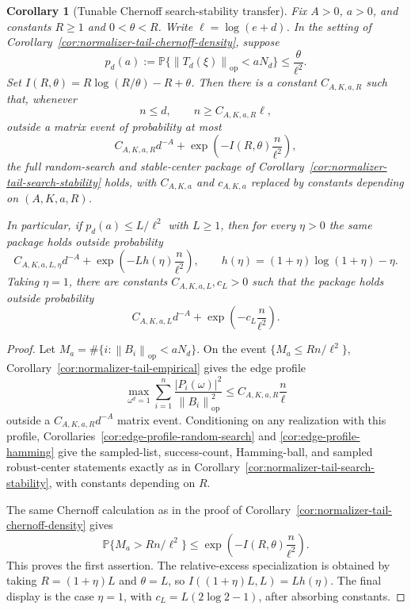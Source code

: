 \documentclass[11pt]{amsart}
\numberwithin{equation}{section}
\newtheorem{corollary}[theorem]{Corollary}
\theoremstyle{definition}
\theoremstyle{remark}
\newcommand{\op}{\mathrm{op}}
\newcommand{\Prob}{\mathbb P}
\newcommand{\norm}[1]{\left\lVert #1\right\rVert}
\begin{document}
\begin{corollary}[Tunable Chernoff search-stability transfer]
\label{cor:normalizer-tail-chernoff-search}
Fix \(A>0\), \(a>0\), and constants \(R\ge1\) and \(0<\theta<R\).  Write
\(\ell=\log(e+d)\).  In the setting of
Corollary~\ref{cor:normalizer-tail-chernoff-density}, suppose
\[
  p_d(a):=\Prob\{\norm{T_d(\xi)}_{\op}<aN_d\}\le \frac{\theta}{\ell^2}.
\]
Set \(I(R,\theta)=R\log(R/\theta)-R+\theta\).  Then there is a constant
\(C_{A,K,a,R}\) such that, whenever
\[
  n\le d,\qquad n\ge C_{A,K,a,R}\ell ,
\]
outside a matrix event of probability at most
\[
  C_{A,K,a,R}d^{-A}
  +\exp\left(-I(R,\theta)\frac n{\ell^2}\right),
\]
the full random-search and stable-center package of
Corollary~\ref{cor:normalizer-tail-search-stability} holds, with
\(C_{A,K,a}\) and \(c_{A,K,a}\) replaced by constants depending on
\((A,K,a,R)\).

In particular, if \(p_d(a)\le L/\ell^2\) with \(L\ge1\), then for every
\(\eta>0\) the same package holds outside probability
\[
  C_{A,K,a,L,\eta}d^{-A}
  +\exp\left(-Lh(\eta)\frac n{\ell^2}\right),
  \qquad h(\eta)=(1+\eta)\log(1+\eta)-\eta .
\]
Taking \(\eta=1\), there are constants \(C_{A,K,a,L},c_L>0\) such that the
package holds outside probability
\[
  C_{A,K,a,L}d^{-A}+\exp\left(-c_L\frac n{\ell^2}\right).
\]
\end{corollary}

\begin{proof}
Let \(M_a=\#\{i:\norm{B_i}_{\op}<aN_d\}\).  On the event
\(\{M_a\le Rn/\ell^2\}\), Corollary~\ref{cor:normalizer-tail-empirical} gives the
edge profile
\[
  \max_{\omega^d=1}\sum_{i=1}^n
  \frac{|P_i(\omega)|^2}{\norm{B_i}_{\op}^2}
  \le C_{A,K,a,R}\frac n\ell
\]
outside a \(C_{A,K,a,R}d^{-A}\) matrix event.  Conditioning on any realization
with this profile, Corollaries~\ref{cor:edge-profile-random-search} and
\ref{cor:edge-profile-hamming} give the sampled-list, success-count, Hamming-ball,
and sampled robust-center statements exactly as in
Corollary~\ref{cor:normalizer-tail-search-stability}, with constants depending
on \(R\).

The same Chernoff calculation as in the proof of
Corollary~\ref{cor:normalizer-tail-chernoff-density} gives
\[
  \Prob\{M_a>Rn/\ell^2\}
  \le \exp\left(-I(R,\theta)\frac n{\ell^2}\right).
\]
This proves the first assertion.  The relative-excess specialization is obtained
by taking \(R=(1+\eta)L\) and \(\theta=L\), so
\(I((1+\eta)L,L)=Lh(\eta)\).  The final display is the case \(\eta=1\), with
\(c_L=L(2\log2-1)\), after absorbing constants.
\end{proof}
\end{document}
